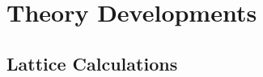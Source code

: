 %
%
%
%
%
%
%
%
%
%
\section{Theory Developments}
\label{sec:theory}


\subsection{Lattice Calculations}


